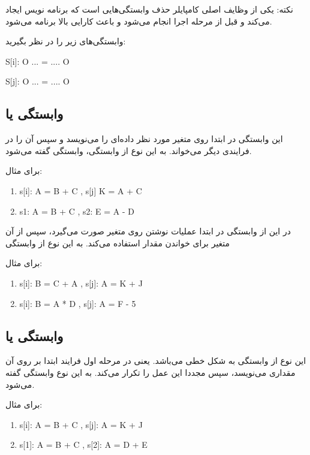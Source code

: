 \documentclass[20pt, a4paper]{article}
\begin{document}
نکته: یکی از وظایف اصلی کامپایلر حذف وابستگی‌هایی است که برنامه نویس ایجاد
می‌کند و قبل از مرحله اجرا انجام می‌شود و باعث کارایی بالا برنامه می‌شود.


وابستگی‌های زیر را در نظر بگیرید:

S[i]: O ... = .... O

S[j]: O ... = .... O

\subsection{وابستگی  یا }

این وابستگی در ابتدا روی متغیر مورد نظر داده‌ای را می‌نویسد و سپس آن را در
فرایندی دیگر می‌خواند. به این نوع از وابستگی، وابستگی  گفته
می‌شود.

برای مثال:

\begin{enumerate}
    \item s[i]: A = B + C , s[j] K = A + C
    \item s1: A = B + C , s2: E = A - D
\end{enumerate}


در این از وابستگی در ابتدا عملیات نوشتن روی متغیر صورت می‌گیرد، سپس از آن متغیر
برای خواندن مقدار استفاده می‌کند. به این نوع از وابستگی 

برای مثال:

\begin{enumerate}
    \item s[i]: B = C + A , s[j]: A = K + J
    \item s[i]: B = A * D , s[j]: A = F - 5
\end{enumerate}

\subsection{وابستگی  یا }

این نوع از وابستگی به شکل خطی می‌باشد. یعنی در مرحله اول فرایند ابتدا بر روی آن
مقداری می‌نویسد، سپس مجددا این عمل را تکرار می‌کند. به این نوع وابستگی
 گفته می‌شود.

برای مثال:

\begin{enumerate}
    \item s[i]: A = B + C , s[j]: A = K + J
    \item s[1]: A = B + C , s[2]: A = D + E
\end{enumerate}
\end{document}
